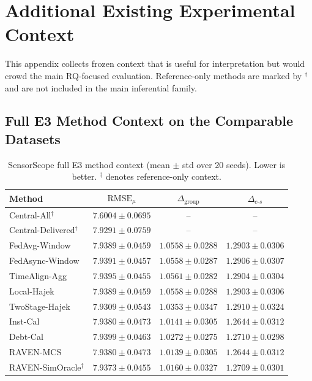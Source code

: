 \documentclass[letterpaper,journal]{IEEEtran}
\begin{document}
\section{Additional Existing Experimental Context}
\label{app:additional_context}

This appendix collects frozen context that is useful for interpretation but
would crowd the main RQ-focused evaluation.  Reference-only methods are marked
by $^\dagger$ and are not included in the main inferential family.

\subsection{Full E3 Method Context on the Comparable Datasets}
\label{app:e3_full_context}

\begin{table}[t]
\centering
\caption{SensorScope full E3 method context (mean $\pm$ std over 20 seeds).
Lower is better.  $^\dagger$ denotes reference-only context.}
\label{tab:app_e3_sensorscope}
\scriptsize
\setlength{\tabcolsep}{4.3pt}
\begin{tabular}{lccc}
\toprule
Method & $\mathrm{RMSE}_{\mu}$ & $\Delta_{\mathrm{group}}$ & $\Delta_{c\text{-}s}$\\
\midrule
Central-All$^{\dagger}$ & $7.6004\pm0.0695$ & -- & -- \\
Central-Delivered$^{\dagger}$ & $7.9291\pm0.0759$ & -- & -- \\
FedAvg-Window & $7.9389\pm0.0459$ & $1.0558\pm0.0288$ & $1.2903\pm0.0306$ \\
FedAsync-Window & $7.9391\pm0.0457$ & $1.0558\pm0.0287$ & $1.2906\pm0.0307$ \\
TimeAlign-Agg & $7.9395\pm0.0455$ & $1.0561\pm0.0282$ & $1.2904\pm0.0304$ \\
Local-Hajek & $7.9389\pm0.0459$ & $1.0558\pm0.0288$ & $1.2903\pm0.0306$ \\
TwoStage-Hajek & $7.9309\pm0.0543$ & $1.0353\pm0.0347$ & $1.2910\pm0.0324$ \\
Inst-Cal & $7.9380\pm0.0473$ & $1.0141\pm0.0305$ & $1.2644\pm0.0312$ \\
Debt-Cal & $7.9399\pm0.0463$ & $1.0272\pm0.0275$ & $1.2710\pm0.0298$ \\
RAVEN-MCS & $7.9380\pm0.0473$ & $1.0139\pm0.0305$ & $1.2644\pm0.0312$ \\
RAVEN-SimOracle$^{\dagger}$ & $7.9373\pm0.0455$ & $1.0160\pm0.0327$ & $1.2709\pm0.0301$ \\
\bottomrule
\end{tabular}
\end{table}
\end{document}
